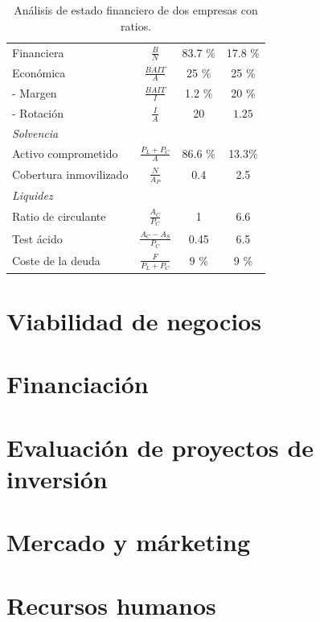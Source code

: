\documentclass[nochap,palatino,notitlepage]{apuntes}
\begin{document}
\begin{table}[hbtp]
\begin{minipage}{\textwidth}
\begin{tabular}{p{2.5cm}|c|c|c}
Financiera & $\frac{B}{N}$ & 83.7 \% & 17.8 \% \\
Económica & $\frac{BAIT}{A}$ & 25 \% & 25 \% \\
- Margen & $\frac{BAIT}{I}$ & 1.2 \% & 20 \% \\
- Rotación & $\frac{I}{A}$ & 20 & $1.25$ \\ \midrule
\multicolumn{4}{l}{\textit{Solvencia}} \\ \midrule
Activo comprometido & $\frac{P_L + P_C}{A}$ & 86.6 \% & 13.3\% \\
Cobertura inmovilizado & $\frac{N}{A_P}$ & 0.4 & 2.5 \\ \midrule
\multicolumn{4}{l}{\textit{Liquidez}} \\ \midrule
Ratio de circulante & $\frac{A_C}{P_C}$ & 1 & 6.6 \\
Test ácido & $\frac{A_C - A_S}{P_C}$ & 0.45 & 6.5 \\ \midrule
Coste de la deuda & $\frac{F}{P_L + P_C}$ & 9 \% & 9 \% \\
\end{tabular}
\caption{Análisis de estado financiero de dos empresas con ratios.}
\label{tab:Ratios}
\end{minipage}
\end{table}

\section{Viabilidad de negocios}
\section{Financiación}
\section{Evaluación de proyectos de inversión}
\section{Mercado y márketing}
\section{Recursos humanos}
\printindex
\end{document}
